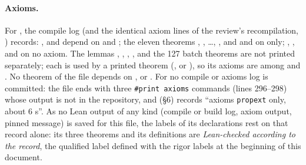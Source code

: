 \paragraph{Axioms.} For , the compile log  (and the identical
axiom lines of the review's recompilation, ) records: ,
 and  depend on  and ; the eleven theorems
, , \dots, , and
 and  on  only; , ,
 and  on no axiom. The lemmas , ,
, ,  and the 127 batch theorems are not printed separately; each is
used by a printed theorem (,  or ), so its axioms are among
 and . No theorem of the file depends on ,  or
. For  no compile or axioms log is committed: the file ends
with three \texttt{\#print axioms} commands (lines 296--298) whose output is not in the repository, and
 (\S6) records ``axioms \texttt{propext} only, about 6 s''. As no Lean output of any kind
(compile or build log, axiom output, pinned message) is saved for this file, the labels of its declarations rest on
that record alone: its three theorems and its definitions are \emph{Lean-checked according to the record}, the
qualified label defined with the rigor labels at the beginning of this document.


